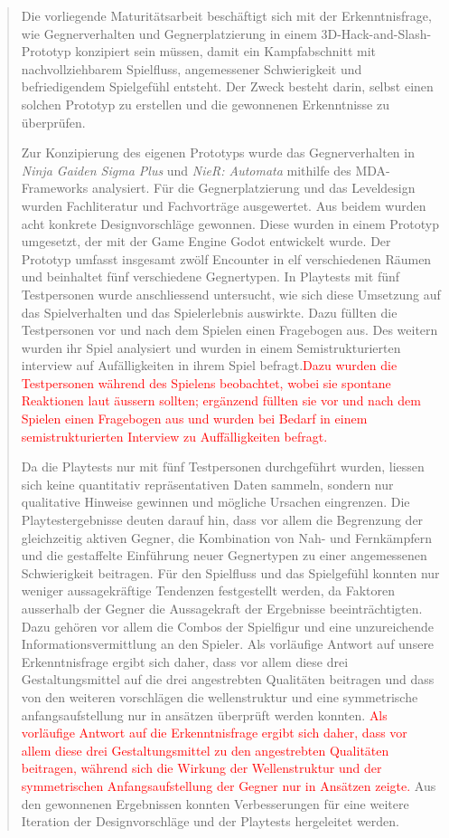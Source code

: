 \documentclass[10pt]{article}
\newcommand{\game}[1]{\textit{#1}}   %
\begin{document}
\begin{abstract}
    Die vorliegende Maturitätsarbeit beschäftigt sich mit der Erkenntnisfrage, wie Gegnerverhalten und Gegnerplatzierung in einem 3D-Hack-and-Slash-Prototyp konzipiert sein müssen, damit ein Kampfabschnitt mit nachvollziehbarem Spielfluss, angemessener Schwierigkeit und befriedigendem Spielgefühl entsteht. Der Zweck besteht darin, selbst einen solchen Prototyp zu erstellen und die gewonnenen Erkenntnisse zu überprüfen.

    Zur Konzipierung des eigenen Prototyps wurde das Gegnerverhalten in \game{Ninja Gaiden Sigma Plus} und \game{NieR: Automata} mithilfe des MDA-Frameworks analysiert. Für die Gegnerplatzierung und das Leveldesign wurden Fachliteratur und Fachvorträge ausgewertet. Aus beidem wurden acht konkrete Designvorschläge gewonnen. Diese wurden in einem Prototyp umgesetzt, der mit der Game Engine Godot entwickelt wurde. Der Prototyp umfasst insgesamt zwölf Encounter in elf verschiedenen Räumen und beinhaltet fünf verschiedene Gegnertypen. In Playtests mit fünf Testpersonen wurde anschliessend untersucht, wie sich diese Umsetzung auf das Spielverhalten und das Spielerlebnis auswirkte. Dazu füllten die Testpersonen vor und nach dem Spielen einen Fragebogen aus. Des weitern wurden ihr Spiel analysiert und wurden in einem Semistrukturierten interview auf Aufälligkeiten in ihrem Spiel befragt.\textcolor{red}{Dazu wurden die Testpersonen während des Spielens beobachtet, wobei sie spontane Reaktionen laut äussern sollten; ergänzend füllten sie vor und nach dem Spielen einen Fragebogen aus und wurden bei Bedarf in einem semistrukturierten Interview zu Auffälligkeiten befragt.}

    Da die Playtests nur mit fünf Testpersonen durchgeführt wurden, liessen sich keine quantitativ repräsentativen Daten sammeln, sondern nur qualitative Hinweise gewinnen und mögliche Ursachen eingrenzen. Die Playtestergebnisse deuten darauf hin, dass vor allem die Begrenzung der gleichzeitig aktiven Gegner, die Kombination von Nah- und Fernkämpfern und die gestaffelte Einführung neuer Gegnertypen zu einer angemessenen Schwierigkeit beitragen. Für den Spielfluss und das Spielgefühl konnten nur weniger aussagekräftige Tendenzen festgestellt werden, da Faktoren ausserhalb der Gegner die Aussagekraft der Ergebnisse beeinträchtigten. Dazu gehören vor allem die Combos der Spielfigur und eine unzureichende Informationsvermittlung an den Spieler. Als vorläufige Antwort auf unsere Erkenntnisfrage ergibt sich daher, dass vor allem diese drei Gestaltungsmittel auf die drei angestrebten Qualitäten beitragen und dass von den weiteren vorschlägen die wellenstruktur und eine symmetrische anfangsaufstellung nur in ansätzen überprüft werden konnten. \textcolor{red}{Als vorläufige Antwort auf die Erkenntnisfrage ergibt sich daher, dass vor allem diese drei Gestaltungsmittel zu den angestrebten Qualitäten beitragen, während sich die Wirkung der Wellenstruktur und der symmetrischen Anfangsaufstellung der Gegner nur in Ansätzen zeigte.} Aus den gewonnenen Ergebnissen konnten Verbesserungen für eine weitere Iteration der Designvorschläge und der Playtests hergeleitet werden.
\end{abstract}
\end{document}
